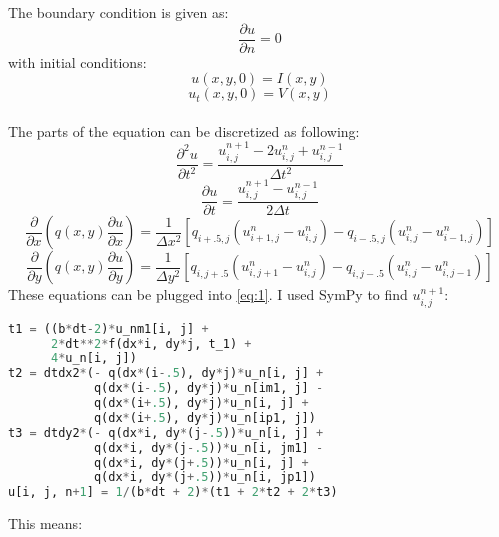 \documentclass{report}
\begin{document}
        The boundary condition is given as:
        \begin{equation}
            \frac{\partial u}{\partial n} = 0
        \end{equation}
        with initial conditions:
        \begin{equation}
            u(x, y, 0) = I(x, y)
        \end{equation}
        \begin{equation}
            u_t(x, y, 0) = V(x, y)
        \end{equation}
        \\
        The parts of the equation can be discretized as following:
        \begin{equation}
            \frac{\partial^2 u}{\partial t^2} = \frac{u^{n+1}_{i,j}-2u^{n}_{i,j}+u^{n-1}_{i,j}}{\Delta t^2}
        \end{equation}
        \begin{equation}
            \frac{\partial u}{\partial t} = \frac{u^{n+1}_{i,j}-u^{n-1}_{i,j}}{2\Delta t}
        \end{equation}
        \begin{equation}
        \frac{\partial}{\partial x}(q(x, y)\frac{\partial u}{\partial x}) = \frac{1}{\Delta x^2}[q_{i+.5,j}(u^{n}_{i+1,j}-u^{n}_{i,j})-q_{i-.5,j}(u^{n}_{i,j}-u^{n}_{i-1,j})]
        \end{equation}
        \begin{equation}
        \frac{\partial}{\partial y}(q(x, y)\frac{\partial u}{\partial y}) = \frac{1}{\Delta y^2}[q_{i,j+.5}(u^{n}_{i,j+1}-u^{n}_{i,j})-q_{i,j-.5}(u^{n}_{i,j}-u^{n}_{i,j-1})]
        \end{equation}
        \newpage
        These equations can be plugged into \ref{eq:1}. I used SymPy to find $u^{n+1}_{i,j}$:
        \begin{lstlisting}[language=Python]
t1 = ((b*dt-2)*u_nm1[i, j] +
      2*dt**2*f(dx*i, dy*j, t_1) +
      4*u_n[i, j])
t2 = dtdx2*(- q(dx*(i-.5), dy*j)*u_n[i, j] +
            q(dx*(i-.5), dy*j)*u_n[im1, j] -
            q(dx*(i+.5), dy*j)*u_n[i, j] +
            q(dx*(i+.5), dy*j)*u_n[ip1, j])
t3 = dtdy2*(- q(dx*i, dy*(j-.5))*u_n[i, j] +
            q(dx*i, dy*(j-.5))*u_n[i, jm1] -
            q(dx*i, dy*(j+.5))*u_n[i, j] +
            q(dx*i, dy*(j+.5))*u_n[i, jp1])
u[i, j, n+1] = 1/(b*dt + 2)*(t1 + 2*t2 + 2*t3)
        \end{lstlisting}
        This means:\\ \\
\end{document}
